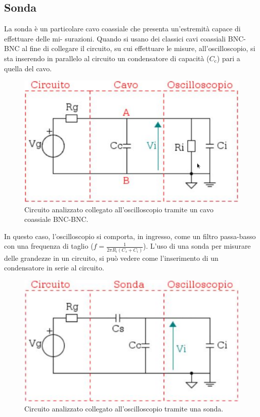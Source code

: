 \documentclass[a4paper]{article}
\begin{document}
		\subsection{Sonda}
			La sonda è un particolare cavo coassiale che presenta un'estremità capace di effettuare delle mi-
			\newline
			surazioni.
			\newline
			Quando si usano dei classici cavi coassiali BNC-BNC al fine di collegare il circuito, su cui effettuare le misure, all'oscilloscopio, si sta inserendo in parallelo al circuito un condensatore di capacità ($ C_{\mathrm{c}} $) pari a quella del cavo.
			\begin{figure}[h!]
				\centering
				\includegraphics[scale=0.4]{theveninCavoDSO}
				\caption{Circuito analizzato collegato all'oscilloscopio tramite un cavo coassiale BNC-BNC.}
				\label{fig:theveninCavoDSO}
			\end{figure}
			\newpage
			In questo caso, l’oscilloscopio si comporta, in ingresso, come un filtro passa-basso con una frequenza di taglio ($ f = \frac{1}{2\pi R_{i} (C_{s} + C_{i})} $). L'uso di una sonda per misurare delle grandezze in un circuito, si può vedere come l'inserimento di un condensatore in serie al circuito.
			\begin{figure}[h!]
				\centering
				\includegraphics[scale=0.4]{theveninSondaDSOCircuito}
				\caption{Circuito analizzato collegato all'oscilloscopio tramite una sonda.}
				\label{fig:theveninSondaDSOCircuito}
			\end{figure}
\end{document}

